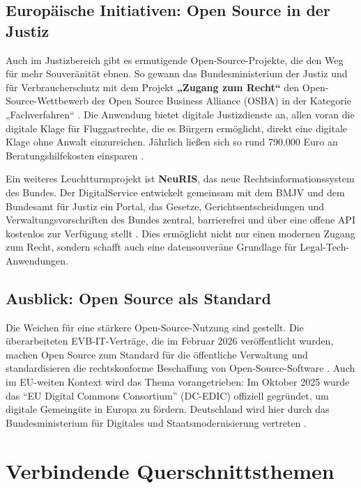 \documentclass[12pt,a4paper]{article}
\begin{document}
	\subsection{Europäische Initiativen: Open Source in der Justiz}
	
	Auch im Justizbereich gibt es ermutigende Open-Source-Projekte, die den Weg für mehr Souveränität ebnen. So gewann das Bundesministerium der Justiz und für Verbraucherschutz mit dem Projekt \textbf{„Zugang zum Recht“} den Open-Source-Wettbewerb der Open Source Business Alliance (OSBA) in der Kategorie „Fachverfahren“ \cite{Heise2025c}. Die Anwendung bietet digitale Justizdienste an, allen voran die digitale Klage für Fluggastrechte, die es Bürgern ermöglicht, direkt eine digitale Klage ohne Anwalt einzureichen. Jährlich ließen sich so rund 790.000 Euro an Beratungshilfekosten einsparen \cite{Heise2025c}.
	
	Ein weiteres Leuchtturmprojekt ist \textbf{NeuRIS}, das neue Rechtsinformationssystem des Bundes. Der DigitalService entwickelt gemeinsam mit dem BMJV und dem Bundesamt für Justiz ein Portal, das Gesetze, Gerichtsentscheidungen und Verwaltungsvorschriften des Bundes zentral, barrierefrei und über eine offene API kostenlos zur Verfügung stellt \cite{NeuRIS2025}. Dies ermöglicht nicht nur einen modernen Zugang zum Recht, sondern schafft auch eine datensouveräne Grundlage für Legal-Tech-Anwendungen.
	
	\subsection{Ausblick: Open Source als Standard}
	
	Die Weichen für eine stärkere Open-Source-Nutzung sind gestellt. Die überarbeiteten EVB-IT-Verträge, die im Februar 2026 veröffentlicht wurden, machen Open Source zum Standard für die öffentliche Verwaltung und standardisieren die rechtskonforme Beschaffung von Open-Source-Software \cite{ZenDiS2025}. Auch im EU-weiten Kontext wird das Thema vorangetrieben: Im Oktober 2025 wurde das \enquote{EU Digital Commons Consortium} (DC-EDIC) offiziell gegründet, um digitale Gemeingüte in Europa zu fördern. Deutschland wird hier durch das Bundesministerium für Digitales und Staatsmodernisierung vertreten \cite{ZenDiS2025}.
	
	\section{Verbindende Querschnittsthemen}
	
\end{document}

